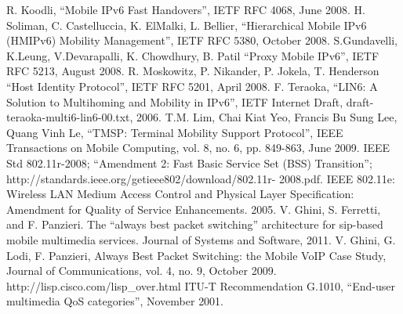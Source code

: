 \begin{thebibliography}{90}
 R. Koodli, ``Mobile IPv6 Fast Handovers'', IETF RFC 4068, June 2008.
  H. Soliman, C. Castelluccia, K. ElMalki, L. Bellier, ``Hierarchical Mobile IPv6 (HMIPv6) Mobility Management'', IETF RFC 5380, October 2008.
 S.Gundavelli, K.Leung, V.Devarapalli, K. Chowdhury, B. Patil ``Proxy Mobile IPv6'', IETF RFC 5213, August 2008.
 R. Moskowitz, P. Nikander, P. Jokela, T. Henderson ``Host Identity Protocol'', IETF RFC 5201, April 2008. 
 F. Teraoka, ``LIN6: A Solution to Multihoming and Mobility in IPv6'', IETF Internet Draft, draft-teraoka-multi6-lin6-00.txt, 2006.
	T.M. Lim, Chai Kiat Yeo, Francis Bu Sung Lee, Quang Vinh Le, ``TMSP: Terminal Mobility Support Protocol'', IEEE Transactions on Mobile Computing, vol. 8, no. 6, pp. 849-863, June 2009.
 IEEE Std 802.11r-2008; ``Amendment 2: Fast Basic Service Set (BSS) Transition''; http://standards.ieee.org/getieee802/download/802.11r- 2008.pdf.
 IEEE 802.11e: Wireless LAN Medium Access Control and Physical Layer Specification: Amendment for Quality of Service Enhancements. 2005.
 V. Ghini, S. Ferretti, and F. Panzieri. The ``always best packet switching'' architecture for sip-based mobile multimedia services. Journal of Systems and Software, 2011.
 V. Ghini, G. Lodi, F. Panzieri, Always Best Packet Switching: the Mobile VoIP Case Study, Journal of Communications, vol. 4, no. 9, October 2009.
 http://lisp.cisco.com/lisp\_over.html
 ITU-T Recommendation G.1010, ``End-user multimedia QoS categories'', November 2001. 
\end{thebibliography}

